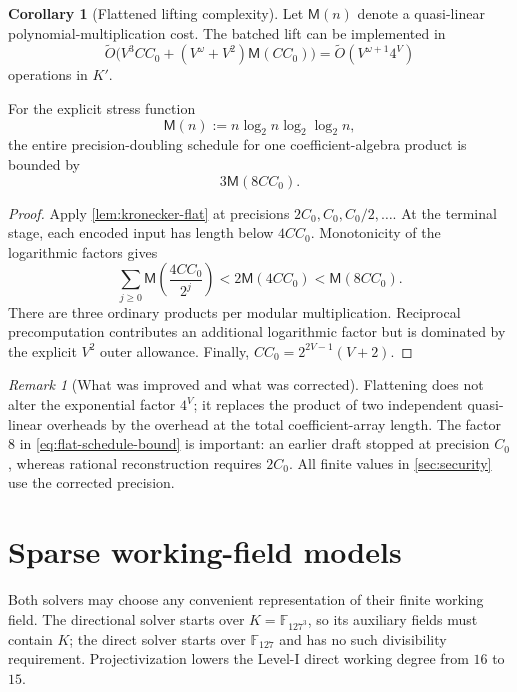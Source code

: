 \documentclass[11pt,a4paper]{article}
\theoremstyle{definition}
\newtheorem{corollary}[theorem]{Corollary}
\theoremstyle{remark}
\newtheorem{remark}[theorem]{Remark}
\newcommand{\F}{\mathbb F}
\newcommand{\softO}{\widetilde O}
\newcommand{\Mmul}{\mathsf M}
\begin{document}
\begin{corollary}[Flattened lifting complexity]\label{cor:flattened-lifting}
Let $\Mmul(n)$ denote a quasi-linear polynomial-multiplication cost.  The batched lift can be implemented in
\begin{equation}\label{eq:flattened-asymptotic}
 \softO\bigl(V^3CC_0+(V^\omega+V^2)\Mmul(CC_0)\bigr)
 =\softO(V^{\omega+1}4^V)
\end{equation}
operations in $K'$.

For the explicit stress function
\begin{equation}\label{eq:M-explicit}
 \Mmul(n):=n\log_2n\log_2\log_2n,
\end{equation}
the entire precision-doubling schedule for one coefficient-algebra product is bounded by
\begin{equation}\label{eq:flat-schedule-bound}
 3\Mmul(8CC_0).
\end{equation}
\end{corollary}

\begin{proof}
Apply \cref{lem:kronecker-flat} at precisions
$2C_0,C_0,C_0/2,\ldots$.  At the terminal stage, each encoded input has length below $4CC_0$.  Monotonicity of the logarithmic factors gives
\[
 \sum_{j\ge0}\Mmul\!\left(\frac{4CC_0}{2^j}\right)
 <2\Mmul(4CC_0)
 <\Mmul(8CC_0).
\]
There are three ordinary products per modular multiplication.  Reciprocal precomputation contributes an additional logarithmic factor but is dominated by the explicit $V^2$ outer allowance.  Finally, $CC_0=2^{2V-1}(V+2)$.
\end{proof}

\begin{remark}[What was improved and what was corrected]\label{rem:no-double-log-product}
Flattening does not alter the exponential factor $4^V$; it replaces the product of two independent quasi-linear overheads by the overhead at the total coefficient-array length.  The factor $8$ in \eqref{eq:flat-schedule-bound} is important: an earlier draft stopped at precision $C_0$, whereas rational reconstruction requires $2C_0$.  All finite values in \cref{sec:security} use the corrected precision.
\end{remark}

\section{Sparse working-field models}\label{sec:sparse-fields}
Both solvers may choose any convenient representation of their finite working
field.  The directional solver starts over $K=\F_{127^3}$, so its auxiliary
fields must contain $K$; the direct solver starts over $\F_{127}$ and has no
such divisibility requirement.  Projectivization lowers the Level-I direct
working degree from $16$ to $15$.
\end{document}
